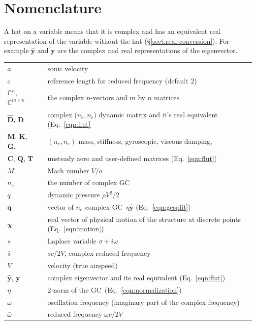\documentclass[10pt,openany,twoside]{book}
\numberwithin{equation}{section}   %
\newcommand{\Matrix}[1]{\boldsymbol{#1}}
\newcommand{\Vector}[1]{\boldsymbol{#1}}
\newcommand{\Gc}{GC}
\newcommand{\Sectref}[1]{\S\ref{#1}}
\newcommand{\Eqn}[1]{Eq.\ \ref{#1}}
\begin{document}
\section{Nomenclature}\label{sect:flut-nomenclature}
A hat on a variable means that it is complex and has an
equivalent real representation of the variable without the hat
(\Sectref{sect:real-conversion}).  For example $\hat{\Vector{y}}$ and
$\Vector{y}$ are the complex and real representations of the eigenvector.
\begin{small}
\noindent\begin{longtable}{@{}lcl@{}}
$a$ & & sonic velocity \\
$c$ & & reference length for reduced frequency (default 2)
	\index{=c@$c$ (ref. length)} \\
$\mathbb{C}^n$, $\mathbb{C}^{m \times n}$ & & the complex $n$-vectors
   and $m$ by $n$ matrices \\
$\hat{\Matrix{D}}$, $\Matrix{D}$ & & complex ($n_e,n_e$) dynamic matrix
	and it's real equivalent (\Eqn{eqn:flut} \\
$\Matrix{M}$, $\Matrix{K}$, $\Matrix{G}$,
	&  & $(n_e,n_e)$ mass, stiffness, gyroscopic, viscous damping, \\
$\Matrix{C}$, $\Matrix{Q}$, $\Matrix{T}$ & & unsteady aero and
   user-defined matrices (\Eqn{eqn:flut}) \\
$M$ & & Mach number $V/a$ \\
$n_e$ & & the number of complex \Gc \\
$q$ & & dynamic pressure $\rho V^2/2$ \\
$\Vector{q}$ & & vector of $n_e$ complex \Gc\ 
	$\eta\Vector{\hat{y}}$ (\Eqn{eqn:gcsplit}) \\
$\Vector{\chi}$ & & real vector of physical motion of the structure
	at discrete points (\Eqn{eqn:motion}) \\
$s$ & & Laplace variable $\sigma + i\omega$ \\
$\bar{s}$ & & $sc/2V$, complex reduced frequency \\
$V$ & & velocity (true airspeed) \\
$\Vector{\hat{y}}$, $\Vector{y}$ & & complex eigenvector and its real
	equivalent (\Eqn{eqn:flut}) \\
$\eta$ & & 2-norm of the \Gc\ (\Eqn{eqn:normalization}) \\
$\omega$ & & oscillation frequency (imaginary part of the complex frequency) \\
$\bar{\omega}$ & & reduced frequency $\omega c/2V$ \\

\end{longtable}
\end{small}
\end{document}
